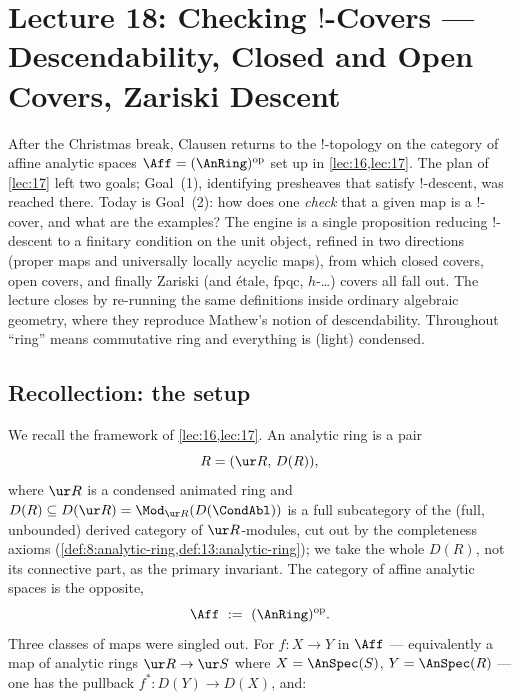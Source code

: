 \section{Lecture 18: Checking \texorpdfstring{$!$}{!}-Covers --- Descendability, Closed and Open Covers, Zariski Descent}
\label{lec:18}

After the Christmas break, Clausen returns to the $!$-topology on the category
of affine analytic spaces $\Aff=(\AnRing)^{\mathrm{op}}$ set up in
\cref{lec:16,lec:17}. The plan of \cref{lec:17} left two goals; Goal~(1),
identifying presheaves that satisfy $!$-descent, was reached there. Today is
Goal~(2): how does one \emph{check} that a given map is a $!$-cover, and what are
the examples? The engine is a single proposition reducing $!$-descent to a
finitary condition on the unit object, refined in two directions (proper maps and
universally locally acyclic maps), from which closed covers, open covers, and
finally Zariski (and \'etale, fpqc, $h$-\dots) covers all fall out. The lecture
closes by re-running the same definitions inside ordinary algebraic geometry,
where they reproduce Mathew's notion of descendability. Throughout ``ring'' means
commutative ring and everything is (light) condensed.

\subsection{Recollection: the setup}
\label{subsec:18:recollection}

We recall the framework of \cref{lec:16,lec:17}. An analytic ring is a pair
\begin{equation*}
R=(\ur R,\,D(R)),
\end{equation*}
where $\ur R$ is a condensed animated ring and $D(R)\subseteq D(\ur R)=
\Mod_{\ur R}(D(\CondAbl))$ is a full subcategory of the (full, unbounded) derived
category of $\ur R$-modules, cut out by the completeness axioms
(\cref{def:8:analytic-ring,def:13:analytic-ring}); we take the whole $D(R)$, not
its connective part, as the primary invariant. The category of affine analytic
spaces is the opposite,
\begin{equation}
\label{eq:18:aff}
\Aff\ :=\ (\AnRing)^{\mathrm{op}}.
\end{equation}
Three classes of maps were singled out. For $f\colon X\to Y$ in $\Aff$ ---
equivalently a map of analytic rings $\ur R\to \ur S$ where $X=\AnSpec(S)$,
$Y=\AnSpec(R)$ --- one has the pullback $f^*\colon D(Y)\to D(X)$, and:

